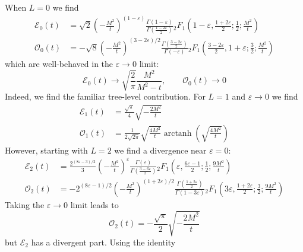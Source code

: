 When $L = 0$ we find
\begin{align}
	\mathcal{E}_{0}(t) &= \sqrt{2} \left( - \frac{M^{2}}{t} \right)^{(1-\varepsilon)} \frac{\Gamma\left( 1 - \varepsilon \right)}{\Gamma\left( \frac{1 - 2\varepsilon}{2} \right)} {}_{2} F_{1} \left( 1 - \varepsilon, \frac{1 + 2\varepsilon}{2}; \frac{1}{2}; \frac{M^{2}}{t} \right) \\
	\mathcal{O}_{0}(t) &= -\sqrt{8} \left( - \frac{M^{2}}{t} \right)^{(3 - 2\varepsilon)/2} \frac{\Gamma\left( \frac{3 - 2\varepsilon}{2} \right)}{\Gamma\left( - \varepsilon \right)} {}_{2} F_{1} \left( \frac{3 - 2\varepsilon}{2}, 1 + \varepsilon; \frac{3}{2}; \frac{M^{2}}{t} \right)
\end{align}
which are well-behaved in the $\varepsilon \rightarrow 0$ limit:
\begin{equation}
	\mathcal{E}_{0}(t) \rightarrow \sqrt{\frac{2}{\pi}}\frac{M^{2}}{M^{2} - t}, \qquad
	\mathcal{O}_{0}(t) \rightarrow 0
\end{equation}
Indeed, we find the familiar tree-level contribution. For $L = 1$ and $\varepsilon \rightarrow 0$ we find
\begin{align}
	\mathcal{E}_{1}(t) &= \frac{\sqrt{\pi}}{4} \sqrt{- \frac{2M^{2}}{t}} \\
	\mathcal{O}_{1}(t) &= \frac{1}{2\sqrt{2\pi}} \sqrt{\frac{4M^{2}}{t}} \operatorname{arctanh}{\left( \sqrt{\frac{4M^{2}}{t}} \right)}
\end{align}
However, starting with $L = 2$ we find a divergence near $\varepsilon = 0$:
\begin{align}
	\mathcal{E}_{2}(t) &= \frac{2^{(8\varepsilon - 3)/2}}{3} \left( - \frac{M^{2}}{t} \right)^{\varepsilon} \frac{\Gamma\left( \varepsilon \right)}{\Gamma\left( \frac{3 - 6\varepsilon}{2} \right)} {}_{2} F_{1} \left( \varepsilon, \frac{6 \varepsilon - 1}{2}; \frac{1}{2}; \frac{9M^{2}}{t} \right) \\
	\mathcal{O}_{2}(t) &= -2^{(8\varepsilon - 1)/2} \left( - \frac{M^{2}}{t} \right)^{(1 + 2\varepsilon)/2} \frac{\Gamma\left( \frac{1 + 2\varepsilon}{2} \right)}{\Gamma\left( 1 - 3 \varepsilon \right)} {}_{2} F_{1} \left( 3\varepsilon, \frac{1 + 2\varepsilon}{2}; \frac{3}{2}; \frac{9M^{2}}{t} \right)
\end{align}
Taking the $\varepsilon \rightarrow 0$ limit leads to
\begin{equation}
	\mathcal{O}_{2}(t) = - \frac{\sqrt{\pi}}{2} \sqrt{-\frac{2M^{2}}{t}}
\end{equation}
but $\mathcal{E}_{2}$ has a divergent part. Using the identity
